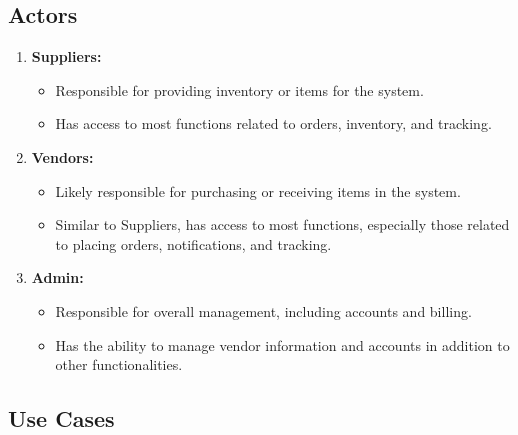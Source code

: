 \subsection{Actors}

\begin{enumerate}
    \item \textbf{Suppliers:}
          \begin{itemize}
              \item Responsible for providing inventory or items for the system.
              \item Has access to most functions related to orders, inventory, and tracking.
          \end{itemize}

    \item \textbf{Vendors:}
          \begin{itemize}
              \item Likely responsible for purchasing or receiving items in the system.
              \item Similar to Suppliers, has access to most functions, especially those related to placing orders, notifications, and tracking.
          \end{itemize}

    \item \textbf{Admin:}
          \begin{itemize}
              \item Responsible for overall management, including accounts and billing.
              \item Has the ability to manage vendor information and accounts in addition to other functionalities.
          \end{itemize}
\end{enumerate}
\subsection{Use Cases}

